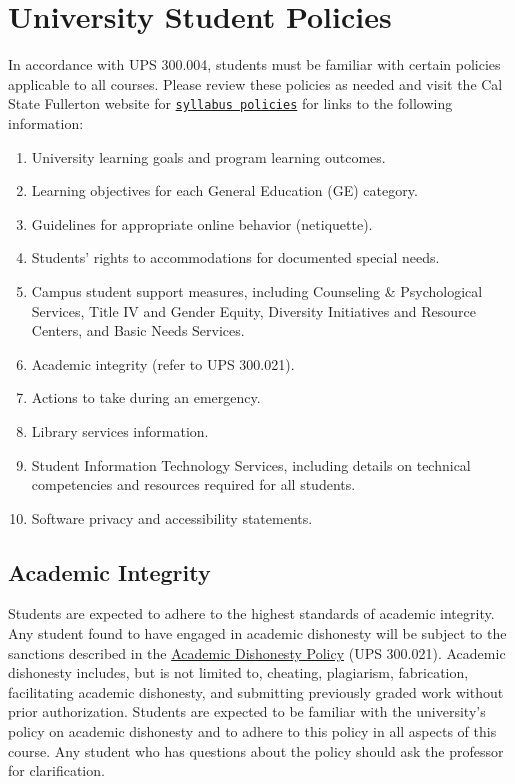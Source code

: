 \documentclass[11pt, letterpaper]{article}
\begin{document}
\section*{University Student Policies}

In accordance with UPS 300.004, students must be familiar with certain policies applicable to all courses. Please review these policies as needed and visit the Cal State Fullerton website for \texttt{\href{https://fdc.fullerton.edu/teaching/student-info-syllabi.html}{syllabus policies}} for links to the following information:

\begin{enumerate}
    \item   University learning goals and program learning outcomes.
    \item	Learning objectives for each General Education (GE) category.
    \item	Guidelines for appropriate online behavior (netiquette).
    \item	Students’ rights to accommodations for documented special needs.
    \item   Campus student support measures, including Counseling \& Psychological Services, Title IV and Gender Equity, Diversity Initiatives and Resource Centers, and Basic Needs Services.
    \item	Academic integrity (refer to UPS 300.021).
    \item	Actions to take during an emergency.
    \item	Library services information.
    \item	Student Information Technology Services, including details on technical competencies and resources required for all students.
    \item	Software privacy and accessibility statements.
\end{enumerate}


\subsection*{Academic Integrity}
Students are expected to adhere to the highest standards of academic integrity. Any student found to have engaged in academic dishonesty will be subject to the sanctions described in the \href{https://www.fullerton.edu/senate/publications_policies_resolutions/ups/UPS%20300/UPS%20300.021.pdf}{Academic Dishonesty Policy} (UPS 300.021). Academic dishonesty includes, but is not limited to, cheating, plagiarism, fabrication, facilitating academic dishonesty, and submitting previously graded work without prior authorization. Students are expected to be familiar with the university's policy on academic dishonesty and to adhere to this policy in all aspects of this course. Any student who has questions about the policy should ask the professor for clarification.
\end{document}
